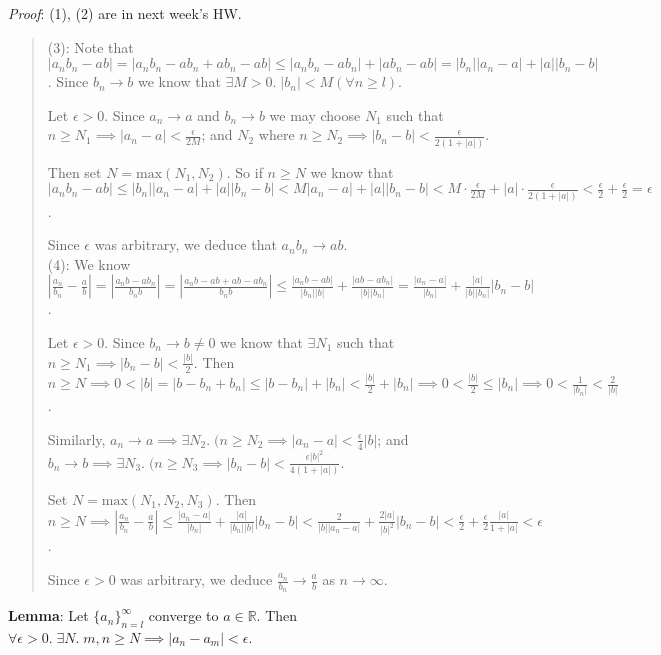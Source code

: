 \documentclass[11pt]{article}
\begin{document}
\emph{Proof}: (1), (2) are in next week's HW.
\begin{quote}\vspace{-0.3cm}
(3): Note that $|a_nb_n - ab| = |a_nb_n - ab_n + ab_n - ab| \leq |a_nb_n - ab_n| + |ab_n - ab| = |b_n||a_n-a| + |a||b_n - b|$. Since $b_n \to b$ we know that $\exists M > 0.\; |b_n| < M (\forall n \geq l)$.

Let $\epsilon > 0$. Since $a_n \to a$ and $b_n \to b$ we may choose $N_1$ such that $n \geq N_1 \implies |a_n - a| < \frac{\epsilon}{2M}$; and $N_2$ where $n \geq N_2 \implies |b_n - b| < \frac{\epsilon}{2(1+|a|)}$.

Then set $N = \text{max}(N_1, N_2)$. So if $n \geq N$ we know that $|a_nb_n - ab| \leq |b_n||a_n-a| + |a||b_n-b| < M|a_n - a| + |a||b_n-b| < M \cdot \frac{\epsilon}{2M} + |a| \cdot \frac{\epsilon}{2(1+|a|)} < \frac{\epsilon}{2} +\frac{\epsilon}{2} = \epsilon$.

Since $\epsilon$ was arbitrary, we deduce that $a_nb_n \to ab$.\\

(4): We know $|\frac{a_n}{b_n} - \frac{a}{b}| = |\frac{a_nb - ab_n}{b_nb}| = |\frac{a_nb - ab + ab - ab_n}{b_nb}| \leq \frac{|a_nb - ab|}{|b_n||b|} + \frac{|ab - ab_n|}{|b||b_n|} = \frac{|a_n-a|}{|b_n|} + \frac{|a|}{|b||b_n|} |b_n - b|$.

Let $\epsilon > 0$. Since $b_n \to b \neq 0$ we know that $\exists N_1$ such that $n \geq N_1 \implies |b_n - b| < \frac{|b|}{2}$. Then $n \geq N \implies 0 < |b| = |b - b_n + b_n| \leq |b-b_n| + |b_n| < \frac{|b|}{2} + |b_n| \implies 0 < \frac{|b|}{2} \leq |b_n| \implies 0 < \frac{1}{|b_n|} < \frac{2}{|b|}$.

Similarly, $a_n \to a \implies \exists N_2 .\; (n \geq N_2 \implies |a_n - a| < \frac{\epsilon}{4} |b|$; and\\
$b_n \to b \implies \exists N_3.\; (n \geq N_3 \implies |b_n - b| < \frac{\epsilon |b|^2}{4(1+|a|)}$.

Set $N = \text{max}(N_1, N_2, N_3)$. Then $n \geq N \implies |\frac{a_n}{b_n} - \frac{a}{b}| \leq \frac{|a_n-a|}{|b_n|} + \frac{|a|}{|b_n||b|} |b_n - b| < \frac{2}{|b| |a_n - a|} + \frac{2|a|}{|b|^2} |b_n - b| < \frac{\epsilon}{2} + \frac{\epsilon}{2} \frac{|a|}{1+|a|} < \epsilon$.

Since $\epsilon > 0$ was arbitrary, we deduce $\frac{a_n}{b_n} \to \frac{a}{b}$ as $n \to \infty$.
\end{quote}

\textbf{Lemma}: Let $\{a_n\}_{n=l}^\infty$ converge to $a \in \mathbb{R}$. Then $\forall \epsilon > 0.\; \exists N.\; m, n \geq N \implies |a_n - a_m| < \epsilon$.
\end{document}

